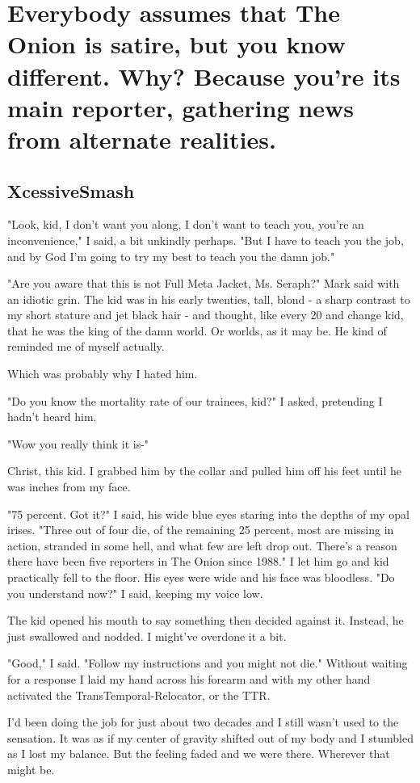 \chapter{Everybody assumes that The Onion is satire, but you know different. Why? Because you're its main reporter, gathering news from alternate realities.}
\section{XcessiveSmash}

"Look, kid, I don't want you along, I don't want to teach you, you're an inconvenience," I said, a bit unkindly perhaps. "But I have to teach you the job, and by God I'm going to try my best to teach you the damn job."

"Are you aware that this is not Full Meta Jacket, Ms. Seraph?" Mark said with an idiotic grin. The kid was in his early twenties, tall, blond - a sharp contrast to my short stature and jet black hair - and thought, like every 20 and change kid, that he was the king of the damn world. Or worlds, as it may be. He kind of reminded me of myself actually.

Which was probably why I hated him.

"Do you know the mortality rate of our trainees, kid?" I asked, pretending I hadn't heard him.

"Wow you really think it is-"

Christ, this kid. I grabbed him by the collar and pulled him off his feet until he was inches from my face.

"75 percent. Got it?" I said, his wide blue eyes staring into the depths of my opal irises. "Three out of four die, of the remaining 25 percent, most are missing in action, stranded in some hell, and what few are left drop out. There's a reason there have been five reporters in The Onion since 1988." I let him go and kid practically fell to the floor. His eyes were wide and his face was bloodless. "Do you understand now?" I said, keeping my voice low.

The kid opened his mouth to say something then decided against it. Instead, he just swallowed and nodded. I might've overdone it a bit.

"Good," I said. "Follow my instructions and you might not die." Without waiting for a response I laid my hand across his forearm and with my other hand activated the TransTemporal-Relocator, or the TTR.

I'd been doing the job for just about two decades and I still wasn't used to the sensation. It was as if my center of gravity shifted out of my body and I stumbled as I lost my balance. But the feeling faded and we were there. Wherever that might be.

